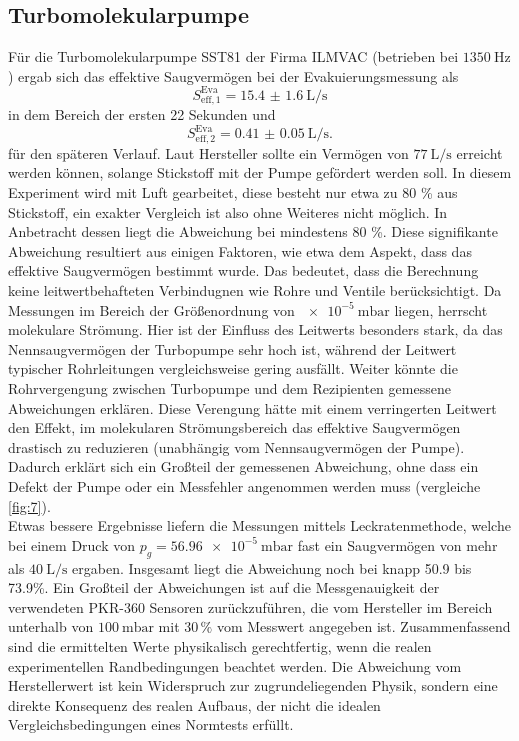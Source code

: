 \subsection{Turbomolekularpumpe}
Für die Turbomolekularpumpe SST81 der Firma ILMVAC (betrieben bei $\qty{1350}{\hertz}$)
ergab sich das effektive Saugvermögen bei der Evakuierungsmessung als
\begin{equation*}
    S_{\text{eff}, 1}^\text{Eva} = \qty{15.4(16)}{\liter\per\second}
\end{equation*}
in dem Bereich der ersten 22 Sekunden und 
\begin{equation*}
    S_{\text{eff}, 2}^\text{Eva} = \qty{0.41(5)}{\liter\per\second}.
\end{equation*}
für den späteren Verlauf.
Laut Hersteller sollte ein Vermögen von $\qty{77}{\liter\per\second}$ erreicht 
werden können, solange Stickstoff mit der Pumpe gefördert werden soll. In diesem 
Experiment wird mit Luft gearbeitet, diese besteht nur etwa zu 80 \% aus Stickstoff, 
ein exakter Vergleich ist also ohne Weiteres nicht möglich. In Anbetracht dessen 
liegt die Abweichung bei mindestens 80 \%. Diese signifikante Abweichung resultiert 
aus einigen Faktoren, wie etwa dem Aspekt, dass das effektive Saugvermögen bestimmt 
wurde. Das bedeutet, dass die Berechnung keine leitwertbehafteten Verbindugnen 
wie Rohre und Ventile berücksichtigt. Da Messungen im Bereich der Größenordnung 
von $\qty{e-5}{\milli\bar}$ liegen, herrscht molekulare Strömung. Hier ist der 
Einfluss des Leitwerts besonders stark, da das Nennsaugvermögen der Turbopumpe
sehr hoch ist, während der Leitwert typischer Rohrleitungen vergleichsweise
gering ausfällt. Weiter könnte die Rohrvergengung zwischen Turbopumpe und dem 
Rezipienten gemessene Abweichungen erklären. Diese Verengung hätte mit einem 
verringerten Leitwert den Effekt, im molekularen Strömungsbereich das effektive 
Saugvermögen drastisch zu reduzieren (unabhängig vom Nennsaugvermögen der Pumpe).
Dadurch erklärt sich ein Großteil der gemessenen Abweichung, ohne dass ein Defekt 
der Pumpe oder ein Messfehler angenommen werden muss (vergleiche \autoref{fig:7}).
\vspace{0.5em}
\\
Etwas bessere Ergebnisse liefern die Messungen mittels Leckratenmethode, welche bei 
einem Druck von $p_g = \qty{56.96e-5}{\milli\bar}$ fast ein Saugvermögen 
von mehr als $\qty{40}{\liter\per\second}$ ergaben. Insgesamt liegt die Abweichung 
noch bei knapp 50.9 bis 73.9\%. Ein Großteil der Abweichungen ist auf die
Messgenauigkeit der verwendeten PKR-360 Sensoren zurückzuführen, die vom Hersteller 
im Bereich unterhalb von $\qty{100}{\milli\bar}$ mit $30\,\%$ vom Messwert
angegeben ist.
\noindent Zusammenfassend sind die ermittelten Werte physikalisch gerechtfertig,
wenn die realen experimentellen Randbedingungen beachtet werden. Die Abweichung
vom Herstellerwert ist kein Widerspruch zur zugrundeliegenden Physik, sondern
eine direkte Konsequenz des realen Aufbaus, der nicht die idealen 
Vergleichsbedingungen eines Normtests erfüllt.

